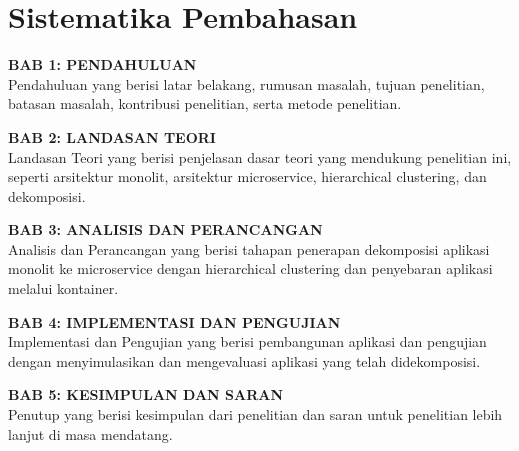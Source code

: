 \section{Sistematika Pembahasan}

\textbf{BAB 1: PENDAHULUAN} \\
Pendahuluan yang berisi latar belakang, rumusan masalah, tujuan penelitian, batasan masalah, kontribusi penelitian, serta metode penelitian.

\textbf{BAB 2: LANDASAN TEORI}\\
Landasan Teori yang berisi penjelasan dasar teori yang mendukung penelitian ini, seperti arsitektur monolit, arsitektur microservice, hierarchical clustering, dan dekomposisi.

\textbf{BAB 3: ANALISIS DAN PERANCANGAN}\\
Analisis dan Perancangan yang berisi tahapan penerapan dekomposisi aplikasi monolit ke microservice dengan hierarchical clustering dan penyebaran aplikasi melalui kontainer.

\textbf{BAB 4: IMPLEMENTASI DAN PENGUJIAN}\\
Implementasi dan Pengujian yang berisi pembangunan aplikasi dan pengujian dengan menyimulasikan dan mengevaluasi aplikasi yang telah didekomposisi.

\textbf{BAB 5: KESIMPULAN DAN SARAN}\\
Penutup yang berisi kesimpulan dari penelitian dan saran untuk penelitian lebih lanjut di masa mendatang.
